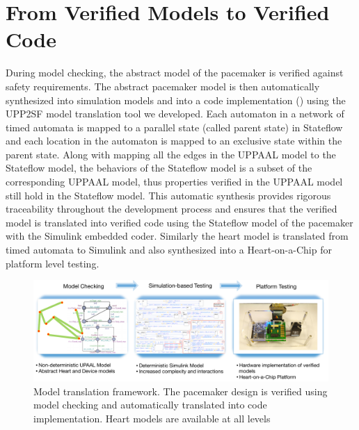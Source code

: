 \section{From Verified Models to Verified Code}
During model checking, the abstract model of the pacemaker is verified against safety requirements. The abstract pacemaker model is then automatically synthesized into simulation models and into a code implementation () using the UPP2SF model translation tool we developed. 
Each automaton in a network of timed automata is mapped to a parallel state (called parent state) in Stateflow and each location in the automaton is mapped to an exclusive state within the parent state.
Along with mapping all the edges in the UPPAAL model to the Stateflow model, the behaviors of the Stateflow model is a subset of the corresponding UPPAAL model, thus properties verified in the UPPAAL model still hold in the Stateflow model.
This automatic synthesis provides rigorous traceability throughout the development process and ensures that the verified model is translated into verified code using the Stateflow model of the pacemaker with the Simulink embedded coder. 
Similarly the heart model is translated from timed automata to Simulink and also synthesized into a Heart-on-a-Chip for platform level testing.

\begin{figure}[t]
	\centering
	\includegraphics[width=\textwidth]{figs/fig4designtoimplementation.pdf}
	\caption{\small Model translation framework. The pacemaker design is verified using model checking and automatically translated into code implementation. Heart models are available at all levels}
	\label{fig:modelbaseddesign}
\end{figure}